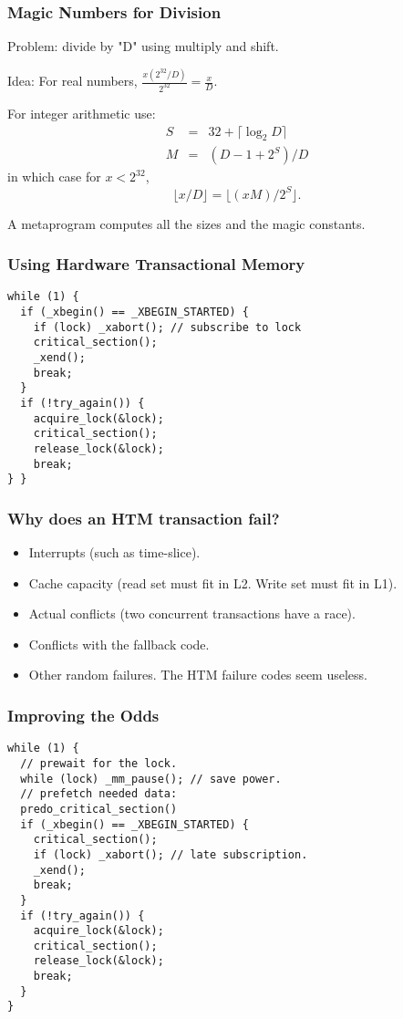 \documentclass[xcolor=dvipsnames,14pt]{beamer}
\begin{document}
\begin{frame}[fragile]
\frametitle{Magic Numbers for Division}

Problem: divide by "D" using multiply and shift.

Idea:  For real numbers, $\frac{x (2^{32}/D)}{2^{32}} = \frac{x}{D}$.

For integer arithmetic use:
\begin{eqnarray*}
S & = & 32+\lceil \log_2 D \rceil \\
M & = & (D-1+2^S)/D 
\end{eqnarray*}
in which case for $x<2^{32}$,
\[
\lfloor x/D \rfloor = \lfloor (xM)/2^S \rfloor.
\]

A metaprogram computes all the sizes and the magic constants.
\end{frame}

\begin{frame}[fragile]
\frametitle{Using Hardware Transactional Memory}

\begin{verbatim}
while (1) {
  if (_xbegin() == _XBEGIN_STARTED) {
    if (lock) _xabort(); // subscribe to lock
    critical_section();
    _xend();
    break;
  }
  if (!try_again()) {
    acquire_lock(&lock);
    critical_section();
    release_lock(&lock);
    break;
} }
\end{verbatim}
\end{frame}

\begin{frame}
\frametitle{Why does an HTM transaction fail?}
\begin{itemize}
\item Interrupts (such as time-slice).
\item Cache capacity (read set must fit in L2.  Write set must fit in L1).
\item Actual conflicts (two concurrent transactions have a race).
\item Conflicts with the fallback code.
\item Other random failures.  The HTM failure codes seem useless.
\end{itemize}

\end{frame}

\begin{frame}[fragile]
\frametitle{Improving the Odds}

\begin{verbatim}
while (1) {
  // prewait for the lock.
  while (lock) _mm_pause(); // save power.
  // prefetch needed data:
  predo_critical_section()
  if (_xbegin() == _XBEGIN_STARTED) {
    critical_section();
    if (lock) _xabort(); // late subscription.
    _xend();
    break;
  }
  if (!try_again()) {
    acquire_lock(&lock);
    critical_section();
    release_lock(&lock);
    break;
  }
}
\end{verbatim}
\end{frame}
\end{document}
